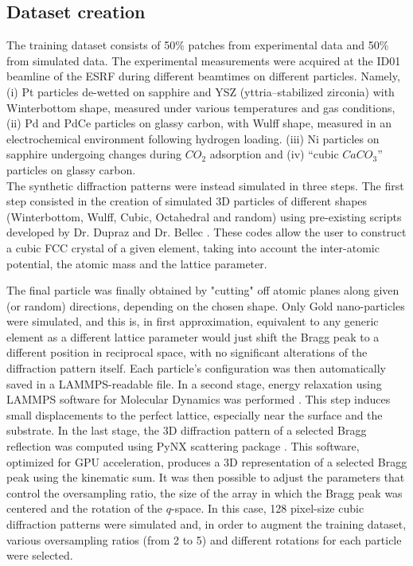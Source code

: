 \subsection{Dataset creation}\label{sec:dataset_creation3D}
The training dataset consists of 50\% patches from experimental data and 50\% from simulated data.
The experimental measurements were acquired at the ID01 beamline of the ESRF during different beamtimes on different particles.
Namely, (i) Pt particles de-wetted on sapphire and YSZ (yttria–stabilized zirconia) with Winterbottom shape, 
measured under various temperatures and gas conditions, (ii) Pd and PdCe particles on glassy carbon, with
Wulff shape, measured in an electrochemical environment following hydrogen loading. (iii) Ni particles on sapphire undergoing
changes during $CO_2$ adsorption and (iv) ``cubic $CaCO_3$'' particles on glassy carbon.
\\
The synthetic diffraction patterns were instead simulated in three steps. The first step consisted in the creation of 
simulated 3D particles of different shapes (Winterbottom, Wulff, Cubic, Octahedral and random) using pre-existing scripts
developed by Dr. Dupraz and Dr. Bellec \cite{lim_convolutional_2021}. These codes allow the user to construct a cubic FCC
crystal of a given element, taking into account the inter-atomic potential, the atomic mass
and the lattice parameter. 

The final particle was finally obtained by "cutting" off atomic planes along given (or random)
directions, depending on the chosen shape. Only Gold nano-particles were simulated, and this is, in first approximation,
equivalent to any generic element as a different lattice parameter would just shift the Bragg peak to a different 
position in reciprocal space, with no significant alterations of the diffraction pattern itself.  
Each particle's configuration was then automatically saved in a LAMMPS-readable file. In a second stage,
energy relaxation using LAMMPS software for Molecular Dynamics was performed \cite{LAMMPS2022}. This step induces small displacements 
to the perfect lattice, especially near the surface and the substrate. In the last stage, the 3D diffraction pattern of a selected Bragg 
reflection was computed using PyNX scattering package \cite{pynx_scattering}. This software, optimized for GPU 
acceleration, produces a 3D representation of a selected Bragg peak using the kinematic sum.
It was then possible to adjust the parameters that control the oversampling ratio, the size of the array in which the 
Bragg peak was centered and the rotation of the $q$-space. In this case, 128 pixel-size cubic diffraction 
patterns were simulated and, in order to augment the training dataset, various oversampling ratios (from 2 to 5) and 
different rotations for each particle were selected.

